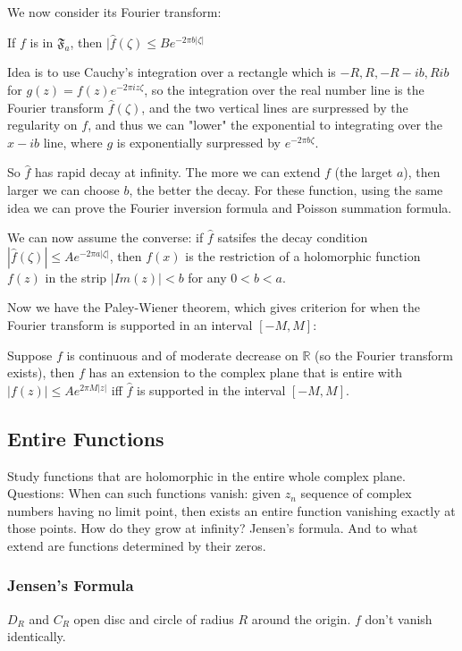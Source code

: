 \documentclass[main.tex]{subfiles}
\newcommand{\F}[1]{
\mathfrak{F}_{#1}}
\begin{document}
We now consider its Fourier transform:
\begin{theorem}
If $f$ is in $\F{a}$, then $|\hat{f}(\zeta) \leq B e^{-2 \pi b |\zeta|}$
\end{theorem}

Idea is to use Cauchy's integration over a rectangle which is $-R, R, -R-ib, R  ib$ for $g(z) = f(z) e^{-2\pi i z \zeta}$, 
so the integration over the real number line is
the Fourier transform $\hat{f}(\zeta)$, and the two vertical lines are surpressed by the regularity on $f$, and thus we can "lower" the exponential to integrating over the $x -ib $ line, where $g$ is exponentially surpressed by $e^{-2 \pi b \zeta}$.

So $\hat{f}$ has rapid decay at infinity. The more we can extend $f$ (the larget $a$), then larger we can choose $b$, the better the decay. For these function, using the same idea we can prove the Fourier inversion formula and Poisson summation formula.

We can now assume the converse: if $\hat{f}$ satsifes the decay condition $|\hat{f}(\zeta)| \leq A e^{-2\pi a |\zeta|}$, then $f(x)$ is the restriction of a holomorphic function $f(z)$ in the strip $|Im(z)| < b$ for any $0 < b < a$.

Now we have the Paley-Wiener theorem, which gives criterion for when the Fourier transform is supported in an interval $[-M, M]$:
\begin{theorem}
Suppose $f$ is continuous and of moderate decrease on $\mathbb{R}$ (so the Fourier transform exists), then $f$ has an extension to the complex plane that is entire with $|f(z)| \leq Ae^{2 \pi M |z|}$ iff $\hat{f}$ is supported in the interval $[-M, M]$.
\end{theorem}

\subsection{Entire Functions}
Study functions that are holomorphic in the entire whole complex plane.
Questions: When can such functions vanish: given $z_n$ sequence of complex numbers having no limit point, then exists an entire function vanishing exactly at those points. How do they grow at infinity? Jensen's formula. And to what extend are functions determined by their zeros.

\subsubsection{Jensen's Formula}
$D_R$ and $C_R$ open disc and circle of radius $R$ around the origin. $f$ don't vanish identically.
\end{document}
